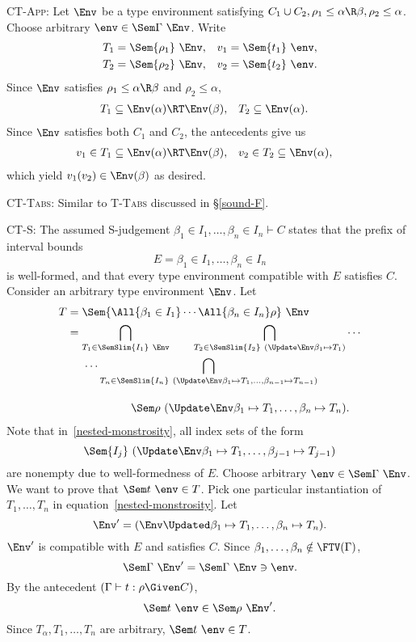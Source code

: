 \documentclass{amsart}
\begin{document}
\textsc{CT-App}: Let $\Env$ be a type environment satisfying
$C_1\cup C_2,\rho_1\le\alpha\R\beta,\rho_2\le\alpha$. Choose
arbitrary $\env\in\Sem\Gamma~\Env$. Write
\begin{align*}
T_1&=\Sem{\rho_1}~\Env,&
v_1&=\Sem{t_1}~\env,\\
T_2&=\Sem{\rho_2}~\Env,&
v_2&=\Sem{t_2}~\env.
\end{align*}
Since $\Env$ satisfies $\rho_1\le\alpha\R\beta$ and
$\rho_2\le\alpha$,
\begin{align*}
T_1&\subseteq \Env(\alpha)\RT\Env(\beta), &
T_2&\subseteq \Env(\alpha).
\end{align*}
Since $\Env$ satisfies both $C_1$ and $C_2$, the antecedents give
us
\begin{align*}
v_1&\in T_1 \subseteq \Env(\alpha)\RT\Env(\beta), &
v_2&\in T_2 \subseteq \Env(\alpha),
\end{align*}
which yield $v_1(v_2)\in\Env(\beta)$ as desired.

\textsc{CT-Tabs}: Similar to \textsc{T-Tabs} discussed in
\S\ref{sound-F}.

\textsc{CT-S}: The assumed S-judgement $\beta_1\in
I_1,\ldots,\beta_n\in I_n\vdash C$ states that the prefix of
interval bounds
\[
E=\beta_1\in I_1,\ldots,\beta_n\in I_n
\]
is well-formed, and that every type environment compatible with
$E$ satisfies $C$. Consider an arbitrary type environment
$\Env$. Let
\begin{align}
\notag
T&=\Sem{\All{\beta_1\in I_1}\cdots\All{\beta_n\in I_n}\rho}~\Env\\
&=
\bigcap_{T_1\in\SemSlim{I_1}~\Env}
\qquad
\bigcap_{T_2\in\SemSlim{I_2}~(\Update\Env\beta_1\mapsto T_1)}
\cdots
\notag\\
&\hspace{0.5cm}\cdots
\bigcap_{T_n\in\SemSlim{I_n}~(\Update\Env
\beta_1\mapsto T_1,\ldots,
\beta_{n-1}\mapsto T_{n-1}
)}
\label{nested-monstrosity}
\\[1em]
&\hspace{2cm}
\Sem\rho~(\Update\Env
\beta_1\mapsto T_1,\ldots,\beta_n\mapsto T_n).
\notag
\end{align}
Note that in~\eqref{nested-monstrosity}, all index sets of the
form
\[
\Sem{I_j}~(\Update\Env\beta_1\mapsto T_1,\ldots,
\beta_{j-1}\mapsto T_{j-1})
\]
are nonempty due to well-formedness of $E$. Choose arbitrary
$\env \in \Sem\Gamma~\Env$. We want to prove that $\Sem
t~\env \in T$. Pick one particular instantiation of
$T_1,\ldots,T_n$ in equation~\eqref{nested-monstrosity}.
Let
\[
\Env'=(\Env\Updated\beta_1\mapsto T_1,\ldots,\beta_n\mapsto T_n).
\]
$\Env'$ is compatible with $E$ and satisfies $C$. Since
$\beta_1,\ldots,\beta_n\notin\FTV(\Gamma)$,
\[
\Sem\Gamma~\Env'=\Sem\Gamma~\Env\ni\env.
\]
By the antecedent $(\Gamma\vdash t:\rho\Given C)$,
\[
\Sem t~\env\in\Sem\rho~\Env'.
\]
Since $T_\alpha,T_1,\ldots,T_n$ are arbitrary, $\Sem t~\env\in T$.
\end{document}
